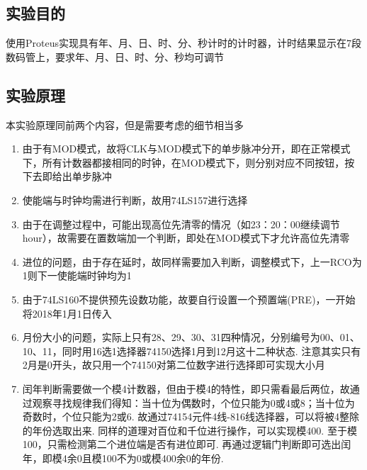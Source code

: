 \documentclass[11pt,UTF8]{ctexart}
\begin{document}
\subsection{实验目的}
使用Proteus实现具有年、月、日、时、分、秒计时的计时器，计时结果显示在7段数码管上，要求年、月、日、时、分、秒均可调节

\subsection{实验原理}
\par 本实验原理同前两个内容，但是需要考虑的细节相当多
\begin{enumerate}
    \item 由于有MOD模式，故将CLK与MOD模式下的单步脉冲分开，即在正常模式下，所有计数器都接相同的时钟，在MOD模式下，则分别对应不同按钮，按下去即给出单步脉冲
    \item 使能端与时钟均需进行判断，故用74LS157进行选择
    \item 由于在调整过程中，可能出现高位先清零的情况（如23：20：00继续调节hour），故需要在置数端加一个判断，即处在MOD模式下才允许高位先清零
    \item 进位的问题，由于存在延时，故同样需要加入判断，调整模式下，上一RCO为1则下一使能端时钟均为1
    \item 由于74LS160不提供预先设数功能，故要自行设置一个预置端(PRE)，一开始将2018年1月1日传入
    \item 月份大小的问题，实际上只有28、29、30、31四种情况，分别编号为00、01、10、11，同时用16选1选择器74150选择1月到12月这十二种状态. 注意其实只有2月是0开头，故只用一个74150对第二位数字进行选择即可实现大小月
    \item 闰年判断需要做一个模4计数器，但由于模4的特性，即只需看最后两位，故通过观察寻找规律我们得知：当十位为偶数时，个位只能为0或4或8；当十位为奇数时，个位只能为2或6. 故通过74154元件4线-816线选择器，可以将被4整除的年份选取出来. 同样的道理对百位和千位进行操作，可以实现模400. 至于模100，只需检测第二个进位端是否有进位即可. 再通过逻辑门判断即可选出闰年，即模4余0且模100不为0或模400余0的年份.
\end{enumerate}
\end{document}
